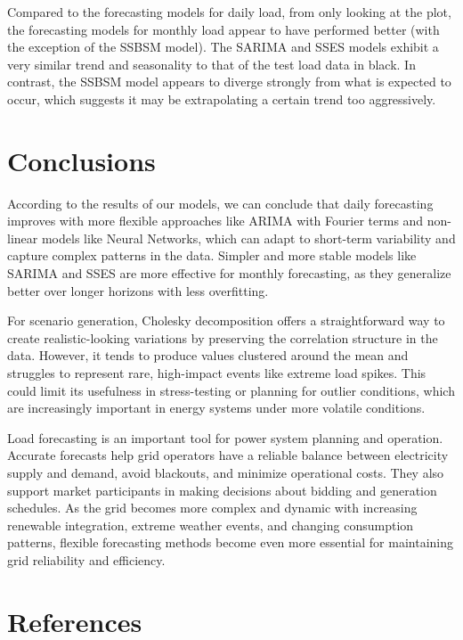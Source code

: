 \documentclass[
]{article}
\begin{document}
Compared to the forecasting models for daily load, from only looking at
the plot, the forecasting models for monthly load appear to have
performed better (with the exception of the SSBSM model). The SARIMA and
SSES models exhibit a very similar trend and seasonality to that of the
test load data in black. In contrast, the SSBSM model appears to diverge
strongly from what is expected to occur, which suggests it may be
extrapolating a certain trend too aggressively.

\newpage

\section{Conclusions}\label{conclusions}

According to the results of our models, we can conclude that daily
forecasting improves with more flexible approaches like ARIMA with
Fourier terms and non-linear models like Neural Networks, which can
adapt to short-term variability and capture complex patterns in the
data. Simpler and more stable models like SARIMA and SSES are more
effective for monthly forecasting, as they generalize better over longer
horizons with less overfitting.

For scenario generation, Cholesky decomposition offers a straightforward
way to create realistic-looking variations by preserving the correlation
structure in the data. However, it tends to produce values clustered
around the mean and struggles to represent rare, high-impact events like
extreme load spikes. This could limit its usefulness in stress-testing
or planning for outlier conditions, which are increasingly important in
energy systems under more volatile conditions.

Load forecasting is an important tool for power system planning and
operation. Accurate forecasts help grid operators have a reliable
balance between electricity supply and demand, avoid blackouts, and
minimize operational costs. They also support market participants in
making decisions about bidding and generation schedules. As the grid
becomes more complex and dynamic with increasing renewable integration,
extreme weather events, and changing consumption patterns, flexible
forecasting methods become even more essential for maintaining grid
reliability and efficiency.

\section{References}\label{references}
\end{document}
